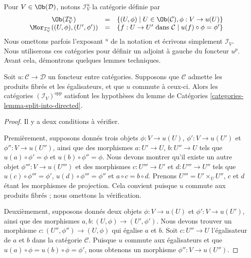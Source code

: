\medskip\noindent
Pour $V \in \Ob(\mathcal{D})$, notons $\mathcal{I}^u_V$
la catégorie définie par
\begin{equation}
\label{equation-colim-category}
\begin{matrix}
\Ob(\mathcal{I}^u_V)
&
=
&
\{
(U, \phi)
\mid
U \in \Ob(\mathcal{C}),
\phi : V \to u(U)
\}
\\
\Mor_{\mathcal{I}^u_V}((U, \phi), (U', \phi'))
&
=
&
\{
f : U \to U' \text{ dans }\mathcal{C}
\mid
u(f) \circ \phi = \phi'
\}
\end{matrix}
\end{equation}
Nous omettons parfois l’exposant ${}^u$ de la notation et écrivons simplement
$\mathcal{I}_V$.
Nous utiliserons ces catégories pour définir un adjoint à gauche du foncteur $u^p$.
Avant cela, démontrons quelques lemmes techniques.

\begin{lemma}
\label{lemma-almost-directed}
Soit $u : \mathcal{C} \to \mathcal{D}$ un foncteur entre catégories.
Supposons que $\mathcal{C}$ admette les produits fibrés et les égalisateurs, et que
$u$ commute à ceux-ci. Alors les catégories $(\mathcal{I}_V)^{opp}$
satisfont les hypothèses du
lemme de Catégories \ref{categories-lemma-split-into-directed}.
\end{lemma}

\begin{proof}
Il y a deux conditions à vérifier.

\medskip\noindent
Premièrement, supposons donnés trois objets
$\phi : V \to u(U)$, $\phi' : V \to u(U')$ et $\phi'' : V \to u(U'')$,
ainsi que des morphismes $a : U' \to U$, $b : U'' \to U$ tels que
$u(a) \circ \phi' = \phi$ et $u(b) \circ \phi'' = \phi$.
Nous devons montrer qu’il existe un autre objet $\phi''' : V \to u(U''')$
et des morphismes $c : U''' \to U'$ et $d : U''' \to U''$ tels que
$u(c) \circ \phi''' = \phi'$, $u(d) \circ \phi''' = \phi''$ et
$a \circ c = b \circ d$. Prenons $U''' = U' \times_U U''$,
$c$ et $d$ étant les morphismes de projection. Cela convient puisque $u$ commute
aux produits fibrés ; nous omettons la vérification.

\medskip\noindent
Deuxièmement, supposons donnés deux objets
$\phi : V \to u(U)$ et $\phi' : V \to u(U')$,
ainsi que des morphismes $a, b : (U, \phi) \to (U', \phi')$.
Nous devons trouver un morphisme $c : (U'', \phi'') \to (U, \phi)$
qui égalise $a$ et $b$. Soit $c : U'' \to U$ l’égalisateur de
$a$ et $b$ dans la catégorie $\mathcal{C}$. Puisque $u$ commute
aux égalisateurs et que $u(a) \circ \phi = u(b) \circ \phi = \phi'$,
nous obtenons un morphisme $\phi'' : V \to u(U'')$.
\end{proof}

